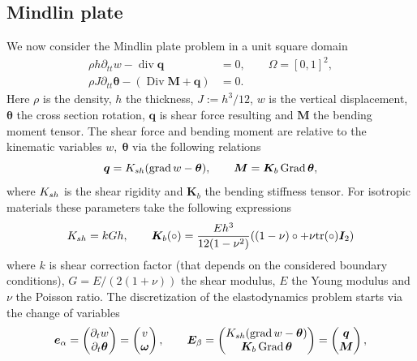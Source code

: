 \documentclass[11pt,a4paper]{article}
\DeclareMathOperator*{\grad}{grad}
\DeclareMathOperator*{\Grad}{Grad}
\renewcommand{\div}{\operatorname{div}}
\DeclareMathOperator*{\Div}{Div}
\begin{document}
\subsection{Mindlin plate}\label{sec:mindlin_plate}
We now consider the Mindlin plate problem in a unit square domain
\begin{equation}\label{eq:mindlin_primal}
\begin{aligned}
\rho h\partial_{tt}{w}-\div\bm{q} &=0, \qquad \Omega = [0, 1]^ 2, \\  
\rho J\partial_{tt}\bm{\bm{\theta}}-(\Div\bm{M} + \bm{q})&=0.
\end{aligned}
\end{equation}
Here $\rho$ is the density, $h$ the thickness, $J:=h^3/12$, $w$ is the vertical displacement, $\bm{\theta}$ the cross section rotation, $\bm{q}$ is shear force resulting and $\bm{M}$ the bending moment tensor. The shear force and bending moment are relative to the kinematic variables $w, \; \bm{\theta}$ via the following relations
$$
\bm{q} = K_{\rm sh} (\grad w - \bm{\theta}), \qquad \bm{M} = \bm{K}_b \Grad \bm{\theta},
$$
where $K_{\rm sh}$ is the shear rigidity and $\bm{K}_b$ the bending stiffness tensor.
For isotropic materials these parameters take the following expressions
$$
K_{\rm sh} = k G h, \qquad 
\bm{K}_b(\circ) = \frac{Eh^3}{12(1 - \nu^2)} ((1 - \nu)\circ + \nu\mathrm{tr}(\circ)\bm{I}_2)
$$
where $k$ is shear correction factor (that depends on the considered boundary conditions), $G = E/(2(1+\nu))$ the shear modulus, $E$ the Young modulus and $\nu$ the Poisson ratio. The discretization of the elastodynamics problem starts via the change of variables
\begin{equation}
    \bm{e}_{\alpha} = \begin{pmatrix}
        \partial_t w \\
        \partial_t \bm{\theta} \\
    \end{pmatrix} = \begin{pmatrix}
        v \\
        \bm{\omega} \\
    \end{pmatrix}, \qquad
    \bm{E}_{\beta} = \begin{pmatrix}
    K_{\rm sh}(\grad w - \bm{\theta})\\
    \bm{K}_b \Grad \bm{\theta} \\
    \end{pmatrix} = 
    \begin{pmatrix}
    \bm{q}\\
    \bm{M} \\
    \end{pmatrix},
\end{equation}
\end{document}
